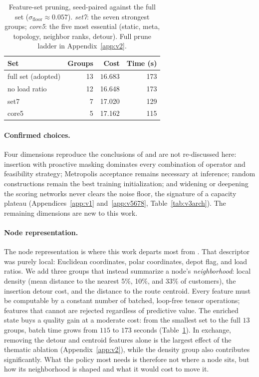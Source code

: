 \documentclass[letterpaper]{article} %
\begin{document}
\begin{table}[t]
\centering
\small
\begin{tabular}{lrrr}
\toprule
\textbf{Set} & \textbf{Groups} & \textbf{Cost} & \textbf{Time (s)} \\
\midrule
full set (adopted) & 13 & $\mathbf{16.683}$ & 173 \\
no load ratio & 12 & 16.648 & 173 \\
set7          & 7  & 17.020 & 129 \\
core5         & 5  & 17.162 & 115 \\
\bottomrule
\end{tabular}
\caption{Feature-set pruning, seed-paired against the full
set ($\sigma_{\mathrm{floor}} \approx 0.057$). \emph{set7}: the seven
strongest groups; \emph{core5}: the five most essential (static, meta, topology, neighbor ranks, detour). Full prune ladder in Appendix~\ref{app:v2}.}
\label{tab:bestset}
\end{table}


\paragraph{Confirmed choices.}
Four dimensions reproduce the conclusions of \citet{AndrettiEtAl26} and are
not re-discussed here: insertion with proactive masking dominates every
combination of operator and feasibility strategy; Metropolis acceptance
remains necessary at inference; random constructions remain the best
training initialization; and widening or deepening the scoring networks
never clears the noise floor, the signature of a capacity plateau
(Appendices~\ref{app:v1} and~\ref{app:v5678}, Table~\ref{tab:v3arch}).
The remaining dimensions are new to this work.


\paragraph{Node representation.}
The node representation is where this work departs most from
\citet{AndrettiEtAl26}. That descriptor was purely local: Euclidean
coordinates, polar coordinates, depot flag, and load ratios. We add three
groups that instead summarize a node's \emph{neighborhood}: local density
(mean distance to the nearest 5\%, 10\%, and 33\% of customers), the
insertion detour cost, and the distance to the route centroid. Every
feature must be computable by a constant number of batched, loop-free
tensor operations; features that cannot are rejected regardless of
predictive value. The enriched state buys a quality gain at a moderate
cost: from the smallest set to the full $13$ groups, batch time grows
from $115$ to $173$ seconds (Table~\ref{tab:bestset}). In exchange,
removing the detour and centroid features alone is the largest effect of
the thematic ablation (Appendix~\ref{app:v2}),%
while the density group also contributes significantly. What the policy most needs is therefore
not where a node sits, but how its neighborhood is shaped and what it
would cost to move it.
\end{document}
